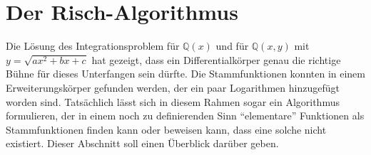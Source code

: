 %
%
%
\section{Der Risch-Algorithmus
\label{buch:integral:section:risch}}
Die Lösung des Integrationsproblem für $\mathbb{Q}(x)$ und für
$\mathbb{Q}(x,y)$ mit $y=\!\sqrt{ax^2+bx+c}$ hat gezeigt, dass
ein Differentialkörper genau die richtige Bühne für dieses Unterfangen
sein dürfte.
Die Stammfunktionen konnten in einem Erweiterungskörper gefunden
werden, der ein paar Logarithmen hinzugefügt worden sind.
Tatsächlich lässt sich in diesem Rahmen sogar ein Algorithmus
formulieren, der in einem noch zu definierenden Sinn ``elementare''
Funktionen als Stammfunktionen finden kann oder beweisen kann, dass
eine solche nicht existiert.
Dieser Abschnitt soll einen Überblick darüber geben.






